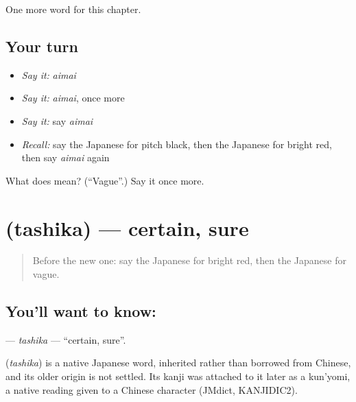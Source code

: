 \begin{grammarlens}[title={What you've built}]
One more word for this chapter.
\end{grammarlens}

\subsection*{Your turn}
\begin{itemize}
\raggedright
  \item \emph{Say it:} \emph{aimai}
  \item \emph{Say it:} \emph{aimai}, once more
  \item \emph{Say it:} say \emph{aimai}
  \item \emph{Recall:} say the Japanese for pitch black, then the Japanese for bright red, then say \emph{aimai} again
\end{itemize}

\begin{tcolorbox}[breakable,colback=teal!4,colframe=teal!35!black,title={Before you move on}]
What does  mean? (\textquotedblleft{}Vague\textquotedblright{}.) Say it once more.
\end{tcolorbox}
\section[\texorpdfstring{\ja{たしか} (tashika)}{たしか (tashika)}]{ (tashika) — certain, sure}

\label{lesson:JA-C130-tashika}



\begin{quote}
Before the new one: say the Japanese for bright red, then the Japanese for vague.
\end{quote}

\subsection*{You'll want to know: }
\textbf{} — \emph{tashika} — \textquotedblleft{}certain, sure\textquotedblright{}.

\begin{cousinweb}
\textbf{} (\emph{tashika}) is a native Japanese word, inherited rather than borrowed from Chinese, and its older origin is not settled. Its kanji was attached to it later as a kun'yomi, a native reading given to a Chinese character (JMdict, KANJIDIC2).
\end{cousinweb}

